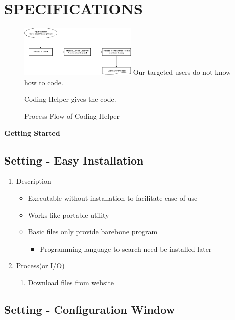 \documentclass[conference]{IEEEtran}
\begin{document}
\section{SPECIFICATIONS} %
\label{sec:specifications}

\begin{figure}[h]
\centering
\includegraphics[width=0.5\textwidth]{./figures/Process_Flow.png}
Our targeted users do not know how to code.

Coding Helper gives the code.
\caption{Process Flow of Coding Helper}
\label{fig_process_flow}
\end{figure}


\textbf{Getting Started}

\subsection{Setting - Easy Installation}

\begin{enumerate}
  \item Description
  \begin{itemize}
    \item Executable without installation to facilitate ease of use
    \item Works like portable utility
    \item Basic files only provide barebone program
    \begin{itemize}
      \item Programming language to search need be installed later
    \end{itemize}
  \end{itemize}
  \item Process(or I/O)
  \begin{enumerate}
    \item Download files from website
  \end{enumerate}
\end{enumerate}
\textit{}


\subsection{Setting - Configuration Window}
\end{document}
